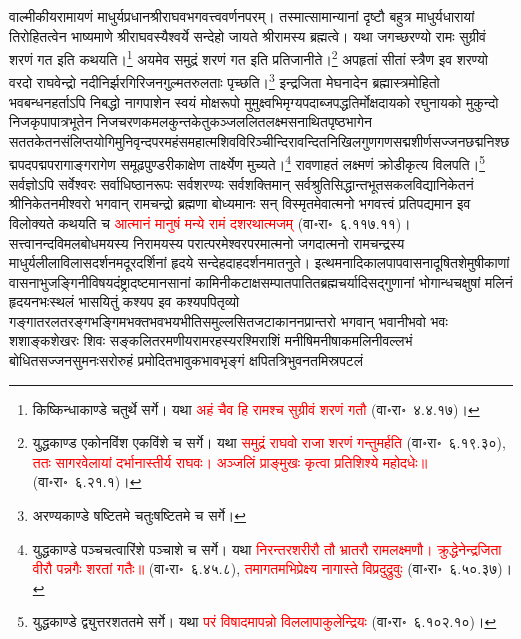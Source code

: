 \begin{sloppypar}\justifying\noindent\hspace{10mm} वाल्मीकीय\-रामायणं माधुर्य\-प्रधान\-श्रीराघव\-भगवत्त्ववर्णन\-परम्। तस्मात्सामान्यानां दृष्टौ बहुत्र माधुर्य\-धारायां तिरोहितत्वेन भाष्यमाणे श्रीराघवस्यैश्वर्ये सन्देहो जायते
श्रीरामस्य ब्रह्मत्वे। यथा जगच्छरण्यो रामः सुग्रीवं शरणं गत इति कथयति।\footnote{किष्किन्धा\-काण्डे चतुर्थे सर्गे। यथा \textcolor{red}{अहं चैव हि रामश्च सुग्रीवं शरणं गतौ} (वा॰रा॰~४.४.१७)।} अयमेव समुद्रं शरणं गत इति प्रतिजानीते।\footnote{युद्ध\-काण्ड एकोनविंश एकविंशे च सर्गे। यथा \textcolor{red}{समुद्रं राघवो राजा शरणं गन्तुमर्हति} (वा॰रा॰~६.१९.३०), \textcolor{red}{ततः सागरवेलायां दर्भानास्तीर्य राघवः। अञ्जलिं प्राङ्मुखः कृत्वा प्रतिशिश्ये महोदधेः॥} (वा॰रा॰~६.२१.१)।} अपहृतां सीतां स्त्रैण इव शरण्यो वरदो राघवेन्द्रो नदी\-निर्झर\-गिरि\-जन\-गुल्म\-तरु\-लताः पृच्छति।\footnote{अरण्य\-काण्डे षष्टितमे चतुःषष्टितमे च सर्गे।} इन्द्रजिता मेघनादेन ब्रह्मास्त्र\-मोहितो भव\-बन्धन\-हर्ताऽपि निबद्धो नाग\-पाशेन स्वयं मोक्ष\-रूपो मुमुक्ष्वभिमृग्य\-पदाब्ज\-पद्धतिर्मोक्ष\-दायको रघु\-नायको मुकुन्दो निज\-कृपा\-पात्र\-भूतेन निज\-चरण\-कमल\-कुन्त\-केतु\-कञ्ज\-ललित\-लक्ष्म\-सनाथित\-पृष्ठ\-भागेन सतत\-केतन\-संलिप्त\-योगि\-मुनि\-वृन्द\-परम\-हंस\-महात्म\-शिव\-विरिञ्चीन्दिरा\-वन्दित\-निखिल\-गुण\-गण\-सद्म\-शीर्ण\-सज्जन\-छद्म\-निश्छद्म\-पद\-पद्म\-परागाङ्ग\-रागेण समूढ\-पुण्डरीकाक्षेण तार्क्ष्येण मुच्यते।\footnote{युद्ध\-काण्डे पञ्च\-चत्वारिंशे पञ्चाशे च सर्गे। यथा \textcolor{red}{निरन्तरशरीरौ तौ भ्रातरौ रामलक्ष्मणौ। क्रुद्धेनेन्द्रजिता वीरौ पन्नगैः शरतां गतैः॥} (वा॰रा॰~६.४५.८), \textcolor{red}{तमागतमभिप्रेक्ष्य नागास्ते विप्रदुद्रुवुः} (वा॰रा॰~६.५०.३७)।} रावणाहतं लक्ष्मणं क्रोडीकृत्य विलपति।\footnote{युद्ध\-काण्डे द्व्युत्तर\-शततमे सर्गे। यथा \textcolor{red}{परं विषादमापन्नो विललापाकुलेन्द्रियः} (वा॰रा॰~६.१०२.१०)।} सर्वज्ञोऽपि सर्वेश्वरः सर्वाधिष्ठान\-रूपः सर्व\-शरण्यः सर्वशक्तिमान् सर्व\-श्रुति\-सिद्धान्त\-भूत\-सकल\-विद्या\-निकेतनं श्रीनिकेतनमीश्वरो भगवान् रामचन्द्रो ब्रह्मणा बोध्यमानः सन् विस्मृतमेवात्मनो भगवत्त्वं प्रतिपद्यमान इव विलोक्यते कथयति च \textcolor{red}{आत्मानं मानुषं मन्ये रामं दशरथात्मजम्} (वा॰रा॰~६.११७.११)।
सत्त्वानन्द\-विमल\-बोध\-मयस्य निरामयस्य परात्परमेश्वर\-परमात्मनो जगदात्मनो रामचन्द्रस्य माधुर्य\-लीला\-विलास\-दर्शनमदूर\-दर्शिनां
हृदये सन्देह\-दाह\-दर्शनमातनुते। इत्थमनादि\-काल\-पाप\-वासना\-दूषित\-शेमुषीकाणां वासना\-भुजङ्गिनी\-विषय\-दंष्ट्रा\-दष्ट\-मानसानां कामिनी\-कटाक्ष\-सम्पात\-पातित\-ब्रह्मचर्यादि\-सद्गुणानां भोगान्ध\-चक्षुषां मलिनं हृदय\-नभःस्थलं भासयितुं कश्यप इव कश्यप\-पितृव्यो गङ्गा\-तरल\-तरङ्ग\-भङ्गिम\-भक्त\-भव\-भय\-भीति\-समुल्लसित\-जटा\-कानन\-प्रान्तरो भगवान् भवानी\-भवो भवः शशाङ्क\-शेखरः शिवः सङ्कलित\-रमणीय\-राम\-रहस्य\-रश्मि\-राशिं मनीषि\-मनीषा\-कमलिनी\-वल्लभं बोधित\-सज्जन\-सुमनः\-सरोरुहं प्रमोदित\-भावुक\-भाव\-भृङ्गं क्षपित\-त्रिभुवन\-तमिस्र\-पटलं

\end{sloppypar}
